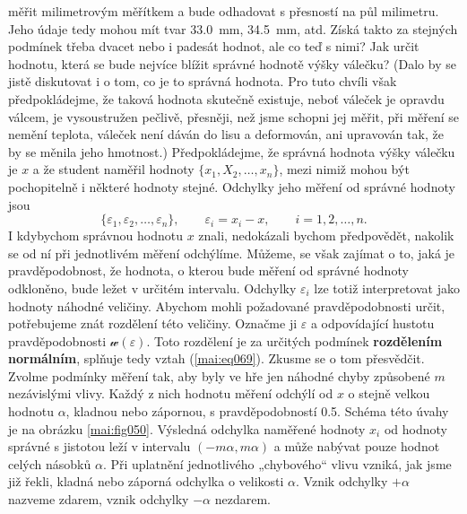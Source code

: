       měřit milimetrovým měřítkem a bude odhadovat s přesností na půl milimetru. Jeho údaje tedy 
      mohou mít tvar \qty{33.0}{\mm}, \qty{34.5}{\mm}, atd. Získá takto za stejných podmínek třeba 
      dvacet nebo i padesát hodnot, ale co teď s nimi? Jak určit hodnotu, která se bude nejvíce 
      blížit správné hodnotě výšky válečku? (Dalo by se jistě diskutovat i o tom, co je to správná 
      hodnota. Pro tuto chvíli však předpokládejme, že taková hodnota skutečně existuje, neboť 
      váleček je opravdu válcem, je vysoustružen pečlivě, přesněji, než jsme schopni jej měřit, při 
      měření se nemění teplota, váleček není dáván do lisu a deformován, ani upravován tak, že by 
      se měnila jeho hmotnost.) Předpokládejme, že správná hodnota výšky válečku je \(x\) a že 
      student naměřil hodnoty \(\lbrace x_1, X_2, \ldots, x_n\rbrace\), mezi nimiž mohou být 
      pochopitelně i některé hodnoty stejné. Odchylky jeho měření od správné hodnoty jsou
      \begin{equation*}
        \lbrace \varepsilon_1, \varepsilon_2, \ldots, \varepsilon_n\rbrace, \qquad
        \varepsilon_i = x_i - x, \qquad i = 1, 2, \ldots, n.
      \end{equation*}
      I kdybychom správnou hodnotu \(x\) znali, nedokázali bychom předpovědět, nakolik se od ní při
      jednotlivém měření odchýlíme. Můžeme, se však zajímat o to, jaká je pravděpodobnost, že
      hodnota, o kterou bude měření od správné hodnoty odkloněno, bude ležet v určitém intervalu.
      Odchylky \(\varepsilon_i\) lze totiž interpretovat jako hodnoty náhodné veličiny. Abychom 
      mohli požadované pravděpodobnosti určit, potřebujeme znát rozdělení této veličiny. Označme ji 
      \(\varepsilon\) a odpovídající hustotu pravděpodobnosti \(\mathcal{w}(\varepsilon)\). Toto 
      rozdělení je za určitých podmínek \textbf{rozdělením normálním}, splňuje tedy vztah 
      (\ref{mai:eq069}). Zkusme se o tom přesvědčit. Zvolme podmínky měření tak, aby byly ve hře 
      jen náhodné chyby způsobené \(m\) nezávislými vlivy. Každý z nich hodnotu měření
      odchýlí od \(x\) o stejně velkou hodnotu \(\alpha\), kladnou nebo zápornou, s 
      pravděpodobností \num{0.5}. Schéma této úvahy je na obrázku \ref{mai:fig050}. Výsledná 
      odchylka naměřené hodnoty \(x_i\) od hodnoty správné s jistotou leží v intervalu \((-m\alpha, 
      m\alpha)\) a může nabývat pouze hodnot celých násobků \(\alpha\). Při uplatnění jednotlivého 
      „chybového“ vlivu vzniká, jak jsme již řekli, kladná nebo záporná odchylka o velikosti 
      \(\alpha\). Vznik odchylky \(+\alpha\) nazveme zdarem, vznik odchylky \(-\alpha\) nezdarem.
      
